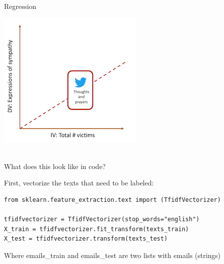 \documentclass[handout]{beamer}
\begin{document}
\begin{frame}{Regression}
	
	\begin{center}
		\includegraphics{../pictures/Zhangetal_3.png} \\\
	\end{center}
	
	\begin{tiny}
	\end{tiny}
	
	
	
	
\end{frame}


\begin{frame}[fragile]{What does this look like in code?}
	
First, vectorize the texts that need to be labeled: 

\begin{lstlisting}
from sklearn.feature_extraction.text import (TfidfVectorizer)

tfidfvectorizer = TfidfVectorizer(stop_words="english")
X_train = tfidfvectorizer.fit_transform(texts_train)
X_test = tfidfvectorizer.transform(texts_test)

\end{lstlisting}

Where emails\_train and emails\_test are two lists with emails (strings)
	
\end{frame}
\end{document}
